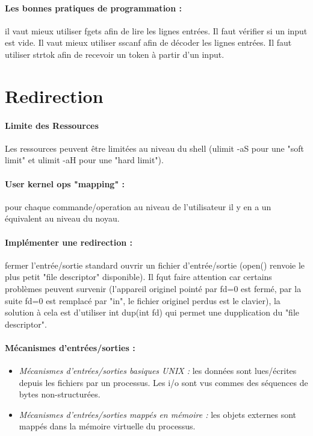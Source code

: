 \documentclass{article}[12pt]
\begin{document}
\paragraph{Les bonnes pratiques de programmation : } il vaut mieux utiliser fgets afin de lire les lignes entrées. Il faut vérifier si un input est vide. Il vaut mieux utiliser sscanf afin de décoder les lignes entrées. Il faut utiliser strtok afin de recevoir un token à partir d'un input.
\section{Redirection}
\paragraph{Limite des Ressources} Les ressources peuvent être limitées au niveau du shell (ulimit -aS pour une "soft limit" et ulimit -aH pour une "hard limit").
\paragraph{User kernel ops "mapping" :} pour chaque commande/operation au niveau de l'utilisateur il y en a un équivalent au niveau du noyau.
\paragraph{Implémenter une redirection :} fermer l'entrée/sortie standard ouvrir un fichier d'entrée/sortie (open() renvoie le plus petit "file descriptor" disponible). Il fqut faire attention car certains problèmes peuvent survenir (l'appareil originel pointé par fd=0 est fermé, par la suite fd=0 est remplacé par "in", le fichier originel perdus est le clavier), la solution à cela est d'utiliser int dup(int fd) qui permet une dupplication du "file descriptor".
\paragraph{Mécanismes d'entrées/sorties : } 
\begin{itemize}
	\item \emph{Mécanismes d'entrées/sorties basiques UNIX : } les données sont lues/écrites depuis les fichiers par un processus. Les i/o sont vus commes des séquences de bytes non-structurées.
	\item \emph{Mécanismes d'entrées/sorties mappés en mémoire : } les objets externes sont mappés dans la mémoire virtuelle du processus.
\end{itemize} 
\end{document}
